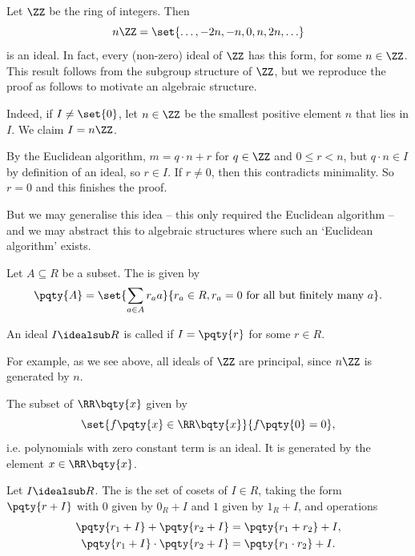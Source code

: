 \begin{example}[Ideals of \(\ZZ\)]
    \label{ex:ideals-of-z}%
    Let \(\ZZ\) be the ring of integers. Then
    \[
        n \ZZ = \set{\ldots, -2n, -n, 0, n, 2n, \ldots}
    \]
    is an ideal. In fact, every (non-zero) ideal of \(\ZZ\) has this form, for some \(n \in \ZZ\). This result follows from the subgroup structure of \(\ZZ\), but we reproduce the proof as follows to motivate an algebraic structure.

    Indeed, if \(I \neq \set{0}\), let \(n \in \ZZ\) be the smallest positive element \(n\) that lies in \(I\). We claim \(I = n\ZZ\).

    By the Euclidean algorithm, \(m = q \cdot n + r\) for \(q \in \ZZ\) and \(0 \leq r < n\), but \(q \cdot n \in I\) by definition of an ideal, so \(r \in I\). If \(r \neq 0\), then this contradicts minimality. So \(r = 0\) and this finishes the proof.
\end{example}

But we may generalise this idea -- this only required the Euclidean algorithm -- and we may abstract this to algebraic structures where such an `Euclidean algorithm' exists.

\begin{definition}
    \label{def:ideal-generated-principal}%
    Let \(A \subseteq R\) be a subset. The  is given by
    \[
        \pqty{A} = \set{\sum_{a \in A} r_a a}{r_a \in R, r_a = 0 \text{ for all but finitely many }a}.
    \]

    An ideal \(I \idealsub R\) is called  if \(I = \pqty{r}\) for some \(r \in R\).
\end{definition}

For example, as we see above, all ideals of \(\ZZ\) are principal, since \(n\ZZ\) is generated by \(n\).

\begin{example}
    \label{ex:ideal-generated}%
    The subset of \(\RR\bqty{x}\) given by
    \[
        \set{f\pqty{x} \in \RR\bqty{x}}{f\pqty{0} = 0},
    \]
    i.e. polynomials with zero constant term is an ideal. It is generated by the element \(x \in \RR\bqty{x}\).
\end{example}

\begin{definition}
    \label{def:quotient-ring}%
    Let \(I \idealsub R\). The  is the set of cosets of \(I \in R\), taking the form \(\pqty{r + I}\) with \(0\) given by \(0_R + I\) and \(1\) given by \(1_R + I\), and operations
    \begin{align*}
        \pqty{r_1 + I} + \pqty{r_2 + I} &= \pqty{r_1 + r_2} + I, \\
        \pqty{r_1 + I} \cdot \pqty{r_2 + I} &= \pqty{r_1 \cdot r_2} + I.
    \end{align*}
\end{definition}

